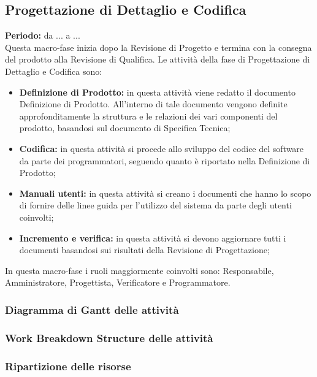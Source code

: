 \subsection{Progettazione di Dettaglio e Codifica}
	\textbf{Periodo:} da ... a ... \\
	Questa macro-fase inizia dopo la Revisione di Progetto e termina con la consegna del prodotto alla Revisione di Qualifica. Le attività della fase di Progettazione di Dettaglio e Codifica sono: \\
	\begin{itemize}
		\item \textbf{Definizione di Prodotto:} in questa attività viene redatto il documento Definizione di Prodotto. All'interno di tale documento vengono definite approfonditamente la struttura e le relazioni dei vari componenti del prodotto, basandosi sul documento di Specifica Tecnica; \\
		\item \textbf{Codifica:} in questa attività si procede allo sviluppo del codice del software da parte dei programmatori, seguendo quanto è riportato nella Definizione di Prodotto; \\
		\item \textbf{Manuali utenti:} in questa attività si creano i documenti che hanno lo scopo
di fornire delle linee guida per l'utilizzo del sistema da parte degli utenti coinvolti; \\
		\item \textbf{Incremento e verifica:} in questa attività si devono aggiornare tutti i documenti
basandosi sui risultati della Revisione di Progettazione; \\
	\end{itemize}
	In questa macro-fase i ruoli maggiormente coinvolti sono: Responsabile, Amministratore, Progettista, Verificatore e Programmatore.
\subsubsection{Diagramma di Gantt delle attività}
\subsubsection{Work Breakdown Structure delle attività}
\subsubsection{Ripartizione delle risorse}
